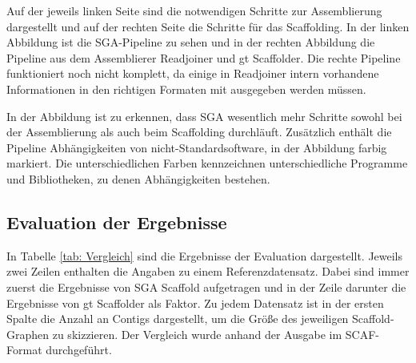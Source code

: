 \documentclass[a4paper,10pt,parskip]{scrartcl}
\begin{document}
Auf der jeweils linken Seite sind die notwendigen Schritte zur
Assemblierung dargestellt und auf der rechten Seite die Schritte für
das Scaffolding. In der linken Abbildung ist die SGA-Pipeline zu sehen
und in der rechten Abbildung die Pipeline aus dem Assemblierer
Readjoiner und gt Scaffolder. Die rechte Pipeline funktioniert noch
nicht komplett, da einige in Readjoiner intern vorhandene
Informationen in den richtigen Formaten mit ausgegeben werden müssen.

In der Abbildung ist zu erkennen, dass SGA wesentlich mehr Schritte
sowohl bei der Assemblierung als auch beim Scaffolding
durchläuft. Zusätzlich enthält die Pipeline Abhängigkeiten von
nicht-Standardsoftware, in der Abbildung farbig markiert. Die
unterschiedlichen Farben kennzeichnen unterschiedliche Programme und
Bibliotheken, zu denen Abhängigkeiten bestehen.


\subsection{Evaluation der Ergebnisse}

In Tabelle \ref{tab: Vergleich} sind die Ergebnisse der Evaluation
dargestellt. Jeweils zwei Zeilen enthalten die Angaben zu einem
Referenzdatensatz. Dabei sind immer zuerst die Ergebnisse von SGA
Scaffold aufgetragen und in der Zeile darunter die Ergebnisse von gt
Scaffolder als Faktor. Zu jedem Datensatz ist in der ersten Spalte die
Anzahl an Contigs dargestellt, um die Größe des jeweiligen
Scaffold-Graphen zu skizzieren. Der Vergleich wurde anhand der Ausgabe
im SCAF-Format durchgeführt.
\end{document}
